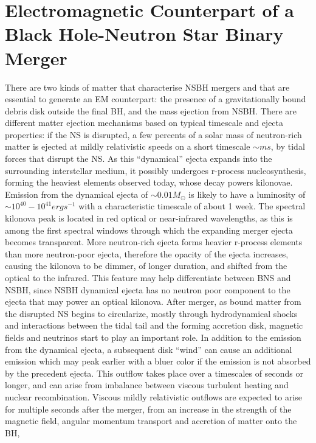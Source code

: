 \documentclass[binding=0.6cm, LaM]{sapthesis}
\begin{document}
\section{Electromagnetic Counterpart of a Black Hole-Neutron Star Binary Merger}
	There are two kinds of matter that characterise NSBH mergers and that are essential to generate an EM counterpart:
        the presence of a gravitationally bound debris disk outside the final BH, and the mass ejection from NSBH.
        There are different matter ejection mechanisms based on typical timescale and ejecta properties:
        if the NS is disrupted, a few percents of a solar mass of neutron-rich matter is
        ejected at mildly relativistic speeds on a short timescale $\sim ms$, by tidal forces that disrupt the NS.
        As this “dynamical” ejecta expands into the surrounding interstellar medium, it possibly undergoes r-process nucleosynthesis,
        forming the heaviest elements observed today, whose decay powers kilonovae.
        Emission from the dynamical ejecta of $\sim0.01 M_{\odot}$ is likely to have a luminosity of
        $\sim10^{40}-10^{41} erg s^{-1}$ with a characteristic timescale of about 1 week.
        The spectral kilonova peak is located in red optical or near-infrared wavelengths, as this is among the first spectral windows
        through which the expanding merger ejecta becomes transparent.
        More neutron-rich ejecta forms heavier r-process elements than more neutron-poor ejecta,
        therefore the opacity of the ejecta increases, causing the kilonova to be dimmer, of longer duration,
        and shifted from the optical to the infrared.
        This feature may help differentiate between BNS and NSBH, since NSBH dynamical ejecta has no neutron poor component to the ejecta that may power an optical kilonova.
        After merger, as bound matter from the disrupted NS begins to circularize, mostly through hydrodynamical shocks
        and interactions between the tidal tail and the forming accretion disk, magnetic fields and neutrinos start to play an important role.
        In addition to the emission from the dynamical ejecta, a subsequent disk “wind” can cause an additional emission
        which may peak earlier with a bluer color if the emission is not absorbed by the precedent ejecta.
        This outflow takes place over a timescales of seconds or longer, and
        can arise from imbalance between viscous turbulent heating and nuclear recombination.
        Viscous mildly relativistic outflows are expected to arise for multiple seconds after the merger,
        from an increase in the strength of the magnetic field, angular momentum transport and accretion of matter onto the BH,
\end{document}
